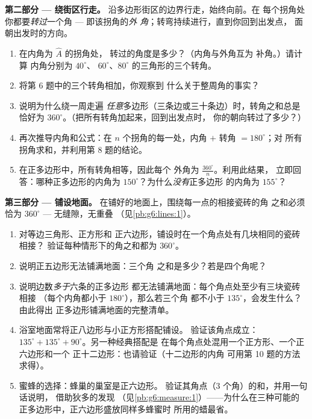 \begin{problem}
\medskip
\noindent\textbf{第二部分 --- 绕街区行走。}
沿多边形街区的边界行走，始终向前。在
每个拐角处你都要\emph{转过}一个角 --- 即该拐角的\emph{外
角}；转弯持续进行，直到你回到出发点，
面朝出发时的方向。
\begin{enumerate}[resume]
  \item 在内角为 $\widehat A$ 的拐角处，
        转过的角度是多少？（内角与外角互为
        补角。）请计算
        内角分别为 $40^\circ$、
        $60^\circ$、$80^\circ$ 的三角形的三个转角。
  \item 将第 6 题中的三个转角相加，你观察到
        什么关于整周角的事实？
  \item 说明为什么绕一周走遍
        \emph{任意}多边形（三条边或三十条边）时，转角之和总是恰好为
        $360^\circ$。（把所有转角加起来，回到出发点时，
        你的朝向转过了多少？）
  \item 再次推导内角和公式：在
        $n$ 个拐角的每一处，内角 $+$ 转角 $= 180^\circ$；对
        所有拐角求和，并利用第 8 题的结论。
  \item 在正多边形中，所有转角相等，因此每个
        外角为 $\frac{360^\circ}{n}$。利用此结果，
        立即回答：哪种正多边形的内角为
        $150^\circ$？为什么\emph{没有}正多边形
        的内角为 $155^\circ$？
\end{enumerate}

\medskip
\noindent\textbf{第三部分 --- 铺设地面。}
在铺好的地面上，围绕每一点的相接瓷砖的角
之和必须恰为 $360^\circ$ --- 无缝隙，无重叠
（见\cref{pb:g6:lines:1}）。
\begin{enumerate}[resume]
  \item 对等边三角形、正方形和
        正六边形，铺设时在一个角点处有几块相同的瓷砖相接？
        验证每种情形下的角之和都为 $360^\circ$。
  \item 说明正五边形无法铺满地面：三个角
        之和是多少？若是四个角呢？
  \item 说明边数\emph{多于}六条的正多边形
        都无法铺满地面：每个角点处至少有三块瓷砖相接
        （每个内角都小于 $180^\circ$），那么若三个角
        都不小于 $135^\circ$，会发生什么？由此得出
        正多边形铺满地面的完整清单。
  \item 浴室地面常将正八边形与小正方形搭配铺设。
        验证该角点成立：
        $135^\circ + 135^\circ + 90^\circ$。另一种经典搭配是
        在每个角点处混用一个正方形、一个正六边形和一个
        正十二边形：也请验证（十二边形的内角
        可用第 10 题的方法求得）。
  \item 蜜蜂的选择：蜂巢的巢室是正六边形。
        验证其角点（$3$ 个角）的和，并用一句话说明，
        借助狄多的发现
        （见\cref{pb:g6:measure:1}）——为什么在三种可能的
        正多边形中，正六边形盛放同样多蜂蜜时
        所用的蜡最省。
\end{enumerate}
\end{problem}
